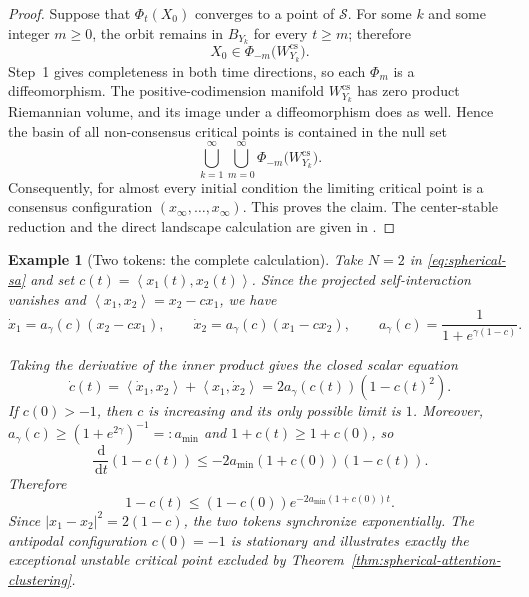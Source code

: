 \documentclass[11pt]{amsart}
\numberwithin{equation}{section}
\theoremstyle{plain}
\newtheorem{example}[theorem]{Example}
\newcommand{\dd}{\,\mathrm{d}}
\newcommand{\abs}[1]{\left\lvert#1\right\rvert}
\newcommand{\ip}[2]{\left\langle#1,#2\right\rangle}
\begin{document}
\begin{proof}
Suppose that $\Phi_t(X_0)$ converges to a point of $\mathcal S$.  For some
$k$ and some integer $m\geq0$, the orbit remains in $B_{Y_k}$ for every
$t\geq m$; therefore
\[
 X_0\in\Phi_{-m}\bigl(W_{Y_k}^{\mathrm{cs}}\bigr).
\]
Step~1 gives completeness in both time directions, so each $\Phi_m$ is a
diffeomorphism.  The positive-codimension manifold $W_{Y_k}^{\mathrm{cs}}$ has
zero product Riemannian volume, and its image under a diffeomorphism does as
well.  Hence the basin of all non-consensus critical points is contained in
the null set
\[
 \bigcup_{k=1}^\infty\bigcup_{m=0}^\infty
 \Phi_{-m}\bigl(W_{Y_k}^{\mathrm{cs}}\bigr).
\]
Consequently, for almost every initial condition the limiting critical point
is a consensus configuration $(x_\infty,\ldots,x_\infty)$.  This proves the
claim.  The center-stable reduction and the direct landscape calculation are
given in
\cite[Theorem~1 and Appendix~C]{CriscitielloEtAl2026Synchronization}.
\end{proof}


\begin{example}[Two tokens: the complete calculation]
\label{ex:two-token-spherical-attention}
Take $N=2$ in \eqref{eq:spherical-sa} and set
$c(t)=\ip{x_1(t)}{x_2(t)}$.  Since the projected self-interaction vanishes and
$ \ip{x_1}{x_2} = x_2-c x_1 $, we have 
\[
 \dot x_1=a_\gamma(c)(x_2-cx_1),\qquad
 \dot x_2=a_\gamma(c)(x_1-cx_2),
 \qquad
 a_\gamma(c)=\frac1{1+e^{\gamma(1-c)}}.
\]

Taking the derivative of the inner product gives the closed scalar equation
\begin{equation}\label{eq:two-token-correlation}
 \dot c(t)= \ip{\dot x_1}{x_2} + \ip{x_1}{\dot x_2}
 =   2a_\gamma(c(t))(1-c(t)^2).
\end{equation}
If $c(0)>-1$, then $c$ is increasing and its only possible limit is $1$.
Moreover,
$a_\gamma(c)\geq(1+e^{2\gamma})^{-1}=:a_{\min}$ and
$1+c(t)\geq1+c(0)$, so
\[
 \frac{\dd}{\dd t}(1-c(t))
 \leq-2a_{\min}(1+c(0))(1-c(t)).
\]
Therefore
\begin{equation}\label{eq:two-token-exponential-clustering}
 1-c(t)\leq(1-c(0))
 e^{-2a_{\min}(1+c(0))t}.
\end{equation}
Since $\abs{x_1-x_2}^2=2(1-c)$, the two tokens synchronize exponentially.
The antipodal configuration $c(0)=-1$ is stationary and illustrates exactly
the exceptional unstable critical point excluded by
Theorem~\ref{thm:spherical-attention-clustering}.
\end{example}
\end{document}
